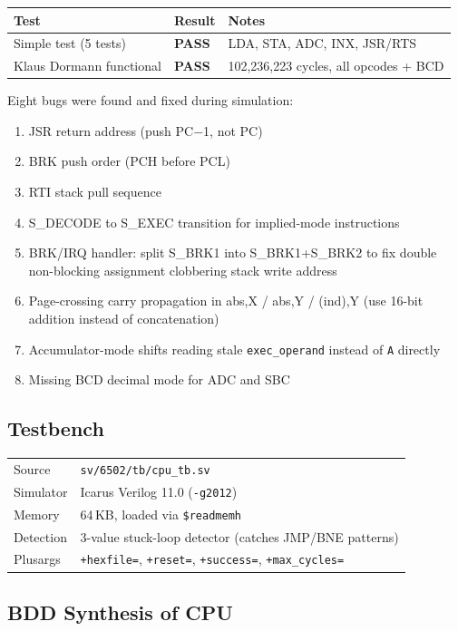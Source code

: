 \documentclass[11pt]{article}
\begin{document}
\begin{tabular}{@{}lll@{}}
\toprule
Test & Result & Notes \\
\midrule
Simple test (5 tests) & \textcolor{pass}{\textbf{PASS}} & LDA, STA, ADC, INX, JSR/RTS \\
Klaus Dormann functional & \textcolor{pass}{\textbf{PASS}} & 102,236,223 cycles, all opcodes + BCD \\
\bottomrule
\end{tabular}

\medskip\noindent
Eight bugs were found and fixed during simulation:
\begin{enumerate}[nosep]
\item JSR return address (push PC$-$1, not PC)
\item BRK push order (PCH before PCL)
\item RTI stack pull sequence
\item S\_DECODE to S\_EXEC transition for implied-mode instructions
\item BRK/IRQ handler: split S\_BRK1 into S\_BRK1+S\_BRK2 to fix
      double non-blocking assignment clobbering stack write address
\item Page-crossing carry propagation in abs,X / abs,Y / (ind),Y
      (use 16-bit addition instead of concatenation)
\item Accumulator-mode shifts reading stale \texttt{exec\_operand}
      instead of \texttt{A} directly
\item Missing BCD decimal mode for ADC and SBC
\end{enumerate}

\subsection{Testbench}

\begin{tabular}{@{}ll@{}}
\toprule
Source & \texttt{sv/6502/tb/cpu\_tb.sv} \\
Simulator & Icarus Verilog 11.0 (\texttt{-g2012}) \\
Memory & 64\,KB, loaded via \texttt{\$readmemh} \\
Detection & 3-value stuck-loop detector (catches JMP/BNE patterns) \\
Plusargs & \texttt{+hexfile=}, \texttt{+reset=}, \texttt{+success=}, \texttt{+max\_cycles=} \\
\bottomrule
\end{tabular}

\subsection{BDD Synthesis of CPU}
\end{document}
